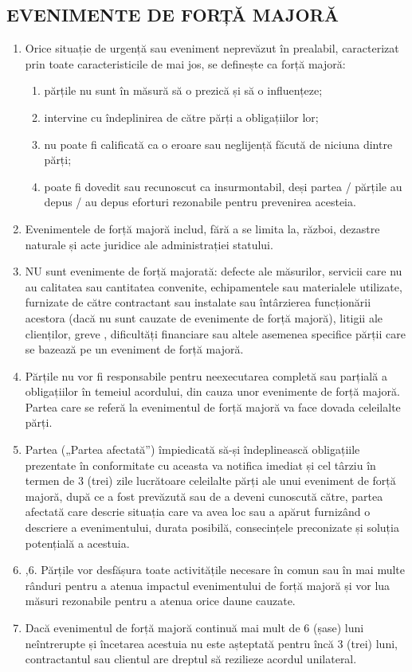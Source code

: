 \begin{multicols}{2}
\subsection{EVENIMENTE  DE FORȚĂ MAJORĂ}
\begin{enumerate}
\item Orice situație de urgență sau eveniment neprevăzut în prealabil, caracterizat prin toate caracteristicile de mai jos, se definește ca forță majoră:
  \begin{enumerate}
\item părțile nu sunt în măsură să o prezică și să o influențeze;
\item intervine cu îndeplinirea de către părți a obligațiilor lor;
\item nu poate fi calificată ca o eroare sau neglijență făcută de niciuna dintre părți;
\item poate fi dovedit sau recunoscut ca insurmontabil, deși partea / părțile au depus / au depus eforturi rezonabile pentru prevenirea acesteia.
\end{enumerate}
\item Evenimentele de forță majoră includ, fără a se limita la, război, dezastre naturale și acte juridice ale administrației statului.
\item NU sunt evenimente de forță majorată: defecte ale măsurilor, servicii care nu au calitatea sau cantitatea convenite, echipamentele sau materialele utilizate, furnizate de către contractant sau instalate sau întârzierea funcționării acestora (dacă nu sunt cauzate de evenimente de forță majoră), litigii ale clienților, greve , dificultăți financiare sau altele asemenea specifice părții care se bazează pe un eveniment de forță majoră.
\item Părțile nu vor fi responsabile pentru neexecutarea completă sau parțială a obligațiilor în temeiul acordului, din cauza unor evenimente de forță majoră. Partea care se referă la evenimentul de forță majoră va face dovada celeilalte părți.
\item Partea („Partea afectată”) împiedicată să-și îndeplinească obligațiile prezentate în conformitate cu aceasta va notifica imediat și cel târziu în termen de 3 (trei) zile lucrătoare celeilalte părți ale unui eveniment de forță majoră, după ce a fost prevăzută sau de a deveni cunoscută către, partea afectată care descrie situația care va avea loc sau a apărut furnizând o descriere a evenimentului, durata posibilă, consecințele preconizate și soluția potențială a acestuia.
\item,6. Părțile vor desfășura toate activitățile necesare în comun sau în mai multe rânduri pentru a atenua impactul evenimentului de forță majoră și vor lua măsuri rezonabile pentru a atenua orice daune cauzate.
\item Dacă evenimentul de forță majoră continuă mai mult de 6 (șase) luni neîntrerupte și încetarea acestuia nu este așteptată pentru încă 3 (trei) luni, contractantul sau clientul are dreptul să rezilieze acordul unilateral.
\end{enumerate}


\end{multicols}
